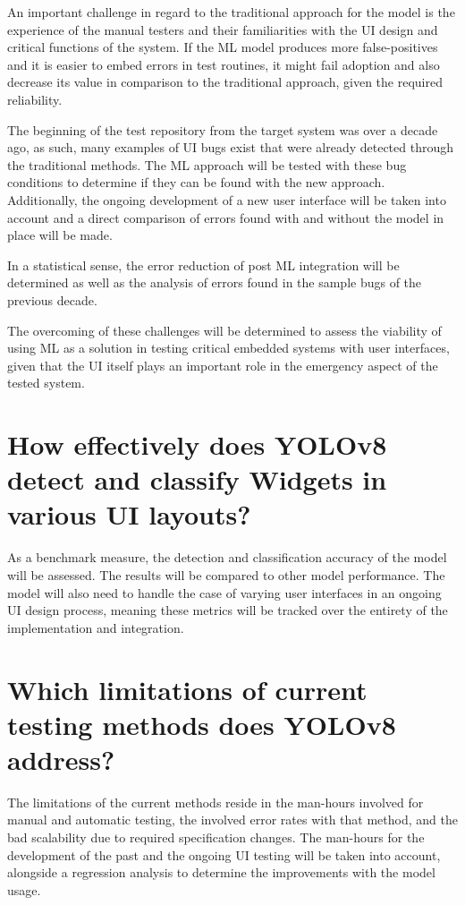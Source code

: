 \documentclass[Proposal,BIC,english,IEEE]{BASE/twbook} %
\begin{document}
An important challenge in regard to the traditional approach for the model is the experience of the manual testers and their familiarities with the UI design and critical functions of the system.
If the ML model produces more false-positives and it is easier to embed errors in test routines, it might fail adoption and also decrease its value in comparison to the traditional approach, given the required reliability.

The beginning of the test repository from the target system was over a decade ago, as such, many examples of UI bugs exist that were already detected through the traditional methods.
The ML approach will be tested with these bug conditions to determine if they can be found with the new approach. Additionally, the ongoing development of a new user interface will be taken into account and a direct comparison of errors found with and without the model in place will be made.

In a statistical sense, the error reduction of post ML integration will be determined as well as the analysis of errors found in the sample bugs of the previous decade.

The overcoming of these challenges will be determined to assess the viability of using ML as a solution in testing critical embedded systems with user interfaces, given that the UI itself plays an important role in the emergency aspect of the tested system.

\section{How effectively does YOLOv8 detect and classify Widgets in various UI layouts?}
As a benchmark measure, the detection and classification accuracy of the model will be assessed. The results will be compared to other model performance.
The model will also need to handle the case of varying user interfaces in an ongoing UI design process, meaning these metrics will be tracked over the entirety of the implementation and integration.

\section{Which limitations of current testing methods does YOLOv8 address?}
The limitations of the current methods reside in the man-hours involved for manual and automatic testing, the involved error rates with that method, and the bad scalability due to required specification changes.
The man-hours for the development of the past and the ongoing UI testing will be taken into account, alongside a regression analysis to determine the improvements with the model usage.
\newpage
\end{document}
